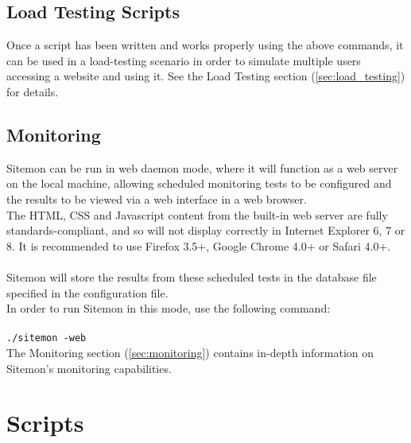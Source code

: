 \documentclass[a4paper]{article}
\begin{document}
\subsection{Load Testing Scripts}

Once a script has been written and works properly using the above commands, it can be used in a load-testing scenario in order to simulate
 multiple users accessing a website and using it. See the Load Testing section (\ref{sec:load_testing}) for details.

\subsection{Monitoring}

Sitemon can be run in web daemon mode, where it will function as a web server on the local machine, allowing scheduled monitoring tests
to be configured and the results to be viewed via a web interface in a web browser.\\ The HTML, CSS and Javascript content from the
built-in web server are fully standards-compliant, and so will not display correctly in Internet Explorer 6, 7 or 8. It is recommended
to use Firefox 3.5+, Google Chrome 4.0+ or Safari 4.0+.\\\\
Sitemon will store the results from these scheduled tests in the database file specified in the configuration file.\\

In order to run Sitemon in this mode, use the following command:\\\\
{\tt ./sitemon -web}\\

The Monitoring section (\ref{sec:monitoring}) contains in-depth information on Sitemon's monitoring capabilities.

\pagebreak

\section{Scripts} \label{sec:scripts}
\end{document}
